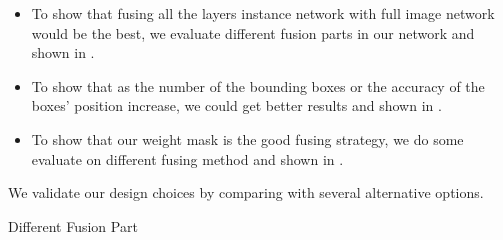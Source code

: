 {\begin{itemize}
    \item To show that fusing all the layers instance network with full image network would be the best, we evaluate different fusion parts in our network and shown in .
    \item To show that as the number of the bounding boxes or the accuracy of the boxes' position increase, we could get better results and shown in .
    \item To show that our weight mask is the good fusing strategy, we do some evaluate on different fusing method and shown in .
\end{itemize}

\begin{table*}[t!]
\caption{ We validate our design choices by comparing with several alternative options.}
\label{tab:ablation}
    \begin{subtable}[t]{0.325\textwidth}
        \centering
        \caption{Different Fusion Part}
        \label{tab:ablation_fusion}
    \end{subtable}
    \hfill
    \begin{subtable}[t]{0.325\textwidth}
        \centering
        \caption{Different Bounding Box Selection}
\end{subtable}
\end{table*}}
